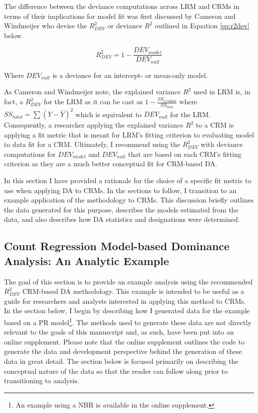 \documentclass[doc]{apa7}
\begin{document}
	The difference between the deviance computations across LRM and CRMs in terms of their implications for model fit was first discussed by Cameron and Windmeijer \parencite*{cameron1996r} who devise the $R^2_{DEV}$ or deviance $R^2$ outlined in Equation \ref{eq:r2dev} below.
	
	\begin{equation}
		R^{2}_{DEV} = 1 - \frac{DEV_{model}}{DEV_{null}}
		\label{eq:r2dev}
	\end{equation}
	
	Where $DEV_{null}$ is a deviance for an intercept- or mean-only model.
	
	As Cameron and Windmeijer note, the explained variance $R^2$ used in LRM is, in fact, a $R^2_{DEV}$ for the LRM as it can be cast as $1 - \frac{SS_{residual}}{SS_{total}}$ where $SS_{total} = \sum (Y - \bar{Y})^2$ which is equivalent to $DEV_{null}$ for the LRM.
	Consequently, a researcher applying the explained variance $R^2$ to a CRM is applying a fit metric that is meant for LRM's fitting criterion to evaluating model to data fit for a CRM.
	Ultimately, I recommend using the $R^{2}_{DEV}$ with deviance computations for $DEV_{model}$ and $DEV_{null}$ that are based on each CRM's fitting criterion as they are a much better conceptual fit for CRM-based DA.
	
	In this section I have provided a rationale for the choice of a specific fit metric to use when applying DA to CRMs.
	In the sections to follow, I transition to an example application of the methodology to CRMs.
	This discussion briefly outlines the data generated for this purpose, describes the models estimated from the data, and also describes how DA statistics and designations were determined.
	
	\subsection{Count Regression Model-based Dominance Analysis: An Analytic Example}
	
	The goal of this section is to provide an example analysis using the recommended $R^2_{DEV}$ CRM-based DA methodology.
	This  example is intended to be useful as a guide for researchers and analysts interested in applying this method to CRMs.
	In the section below, I begin by describing how I generated data for the example based on a PR model\footnote{
		An example using a NBR is available in the online supplement.}.
	The methods used to generate these data are not directly relevant to the goals of this manuscript and, as such, have been put into an online supplement.
	Please note that the online supplement outlines the code to generate the data and development perspective behind the generation of these data in great detail.
	The section below is focused primarily on describing the conceptual nature of the data so that the reader can follow along prior to transitioning to analysis.
	
\end{document}
